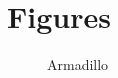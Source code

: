 \chapter{Figures}

\vspace*{-3in}

\begin{figure}
\vspace{2.4in}
\caption{Armadillo}
\label{arm:fig2}
\end{figure}
\clearpage
\newpage
